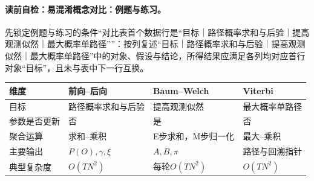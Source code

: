 \label{struct:V3-C05-CH31}
\paragraph{读前自检：易混淆概念对比：例题与练习。}先锁定例题与练习的条件“对比表首个数据行是“目标｜路径概率求和与后验｜提高观测似然｜最大概率单路径””：按列复述“目标｜路径概率求和与后验｜提高观测似然｜最大概率单路径”中的对象、假设与结论，所得结果应满足各列均对应首行对象“目标”，且未与表中下一行互换。\par

\begin{comparisonbox}
\par\medskip
\small
\begin{tabularx}{\linewidth}{@{}>{\raggedright\arraybackslash}p{2.05cm} >{\raggedright\arraybackslash}X >{\raggedright\arraybackslash}X >{\raggedright\arraybackslash}X@{}}
\toprule 维度 & 前向--后向 & Baum--Welch & Viterbi\\ \midrule
目标 & 路径概率求和与后验 & 提高观测似然 & 最大概率单路径\\
参数是否更新 & 否 & 是 & 否\\
聚合运算 & 求和--乘积 & E步求和，M步归一化 & 最大--乘积\\
主要输出 & $P(O),\gamma,\xi$ & $A,B,\pi$ & 路径与回溯指针\\
典型复杂度 & $O(TN^2)$ & 每轮$O(TN^2)$ & $O(TN^2)$\\
\bottomrule
\end{tabularx}
\end{comparisonbox}


